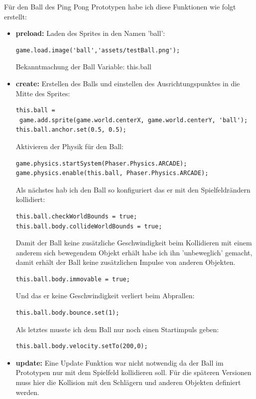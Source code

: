 \newpage
Für den Ball des Ping Pong Prototypen habe ich diese Funktionen wie folgt erstellt:
\begin{itemize}
	\item
	      \textbf{preload:}
	      \newline
	      Laden des Sprites in den Namen 'ball':
	      \newline
	      \begin{lstlisting}
game.load.image('ball','assets/testBall.png');
	      \end{lstlisting}
	      Bekanntmachung der Ball Variable: this.ball
	\item
	      \textbf{create:}
	      \newline Erstellen des Balls und einstellen des Ausrichtungspunktes in die Mitte des Sprites:
	      \begin{lstlisting}
this.ball = 
 game.add.sprite(game.world.centerX, game.world.centerY, 'ball');
this.ball.anchor.set(0.5, 0.5);
	      \end{lstlisting}
	      Aktivieren der Physik für den Ball:
	      \begin{lstlisting}
game.physics.startSystem(Phaser.Physics.ARCADE);
game.physics.enable(this.ball, Phaser.Physics.ARCADE);
	      \end{lstlisting}
	      Als nächstes hab ich den Ball so konfiguriert das er mit den Spielfeldrändern kollidiert:
	      \begin{lstlisting}
this.ball.checkWorldBounds = true;
this.ball.body.collideWorldBounds = true;
	      \end{lstlisting}
	      Damit der Ball keine zusätzliche Geschwindigkeit beim Kollidieren mit einem anderem sich bewegendem Objekt erhält habe ich ihn 'unbeweglich' gemacht, damit erhält der Ball keine zusätzlichen Impulse von anderen Objekten.
	      \begin{lstlisting}
this.ball.body.immovable = true; 
	      \end{lstlisting}
	      Und das er keine Geschwindigkeit verliert beim Abprallen:
	      \begin{lstlisting}
this.ball.body.bounce.set(1);
	      \end{lstlisting}
	      Als letztes musste ich dem Ball nur noch einen Startimpuls geben:
	      \begin{lstlisting}
this.ball.body.velocity.setTo(200,0);
	      \end{lstlisting}
	\item
	      \textbf{update:} 
	      \newline Eine Update Funktion war nicht notwendig da der Ball im Prototypen nur mit dem Spielfeld kollidieren soll.
	      Für die späteren Versionen muss hier die Kollision mit den Schlägern und anderen Objekten definiert werden.
\end{itemize}
